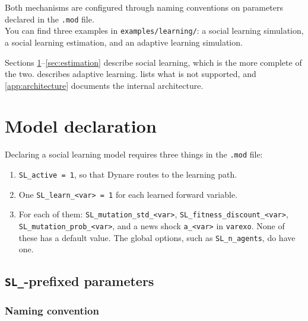 \documentclass[11pt,a4paper]{article}
\newcommand{\command}[1]{\texttt{#1}}
\newcommand{\file}[1]{\texttt{#1}}
\begin{document}
Both mechanisms are configured through naming conventions on parameters
declared in the \file{.mod} file.\\

You can find three  examples in \file{examples/learning/}: a social learning
simulation, a social learning estimation, and an adaptive learning simulation.

\medskip
\noindent Sections
\ref{sec:declaration}--\ref{sec:estimation} describe social learning, which is
the more complete of the two.  describes adaptive learning.
 lists what is not supported, and
\cref{app:architecture} documents the internal architecture.


\section{Model declaration}
\label{sec:declaration}

Declaring a social learning model requires three things in the \file{.mod}
file:

\begin{enumerate}
    \item \texttt{SL\_active = 1}, so that Dynare routes to the learning path.
    \item One \texttt{SL\_learn\_<var> = 1} for each learned forward variable.
    \item For each of them: \texttt{SL\_mutation\_std\_<var>},
          \texttt{SL\_fitness\_discount\_<var>}, \texttt{SL\_mutation\_prob\_<var>},
          and a news shock \texttt{a\_<var>} in \command{varexo}. None of these
          has a default value. The global options, such as
          \texttt{SL\_n\_agents}, do have one.
\end{enumerate}

\subsection{\texttt{SL\_}-prefixed parameters}
\label{sec:declaration:params}

\subsubsection{Naming convention}
\end{document}
